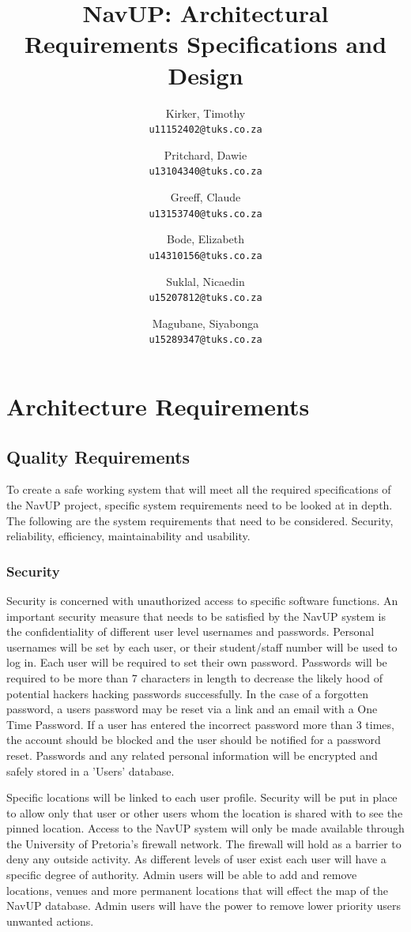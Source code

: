 \documentclass{article}
\title{NavUP: Architectural Requirements Specifications and Design}
\author{	 
	Kirker, Timothy\\
	\texttt{u11152402@tuks.co.za}
	\and
	Pritchard, Dawie\\
	\texttt{u13104340@tuks.co.za}
	\and
	Greeff, Claude\\
	\texttt{u13153740@tuks.co.za}
	\and
	Bode, Elizabeth\\
	\texttt{u14310156@tuks.co.za}
	\and
	Suklal, Nicaedin\\
	\texttt{u15207812@tuks.co.za}
	\and
	Magubane, Siyabonga\\
	\texttt{u15289347@tuks.co.za}
	\and
	
}
\begin{document}
	\maketitle
	\section{Architecture Requirements}
		\subsection{Quality Requirements}
		 To create a safe working system that will meet all the required specifications of the NavUP project, specific system requirements need to be looked at in depth. The following are the system requirements that need to be considered. Security, reliability, efficiency, maintainability and usability.
		 
		 \subsubsection{Security}
		 Security is concerned with unauthorized access to specific software functions. An important security measure that needs to be satisfied by the NavUP system is the confidentiality of different user level usernames and passwords. Personal usernames will be set by each user, or their student/staff number will be used to log in. Each user will be required to set their own password. Passwords will be required to be more than 7 characters in length to decrease the likely hood of potential hackers hacking passwords successfully. In the case of a forgotten password, a users password may be reset via a link and an email with a One Time Password. If a user has entered the incorrect password more than 3 times, the account should be blocked and the user should be notified for a password reset. Passwords and any related personal information will be encrypted and safely stored in a 'Users' database.
		 
		  Specific locations will be linked to each user profile. Security will be put in place to allow only that user or other users whom the location is shared with to see the pinned location. Access to the NavUP system will only be made available through the University of Pretoria's firewall network. The firewall will hold as a barrier to deny any outside activity. As different levels of user exist each user will have a specific degree of authority. Admin users will be able to add and remove locations, venues and more permanent locations that will effect the map of the NavUP database. Admin users will have the power to remove lower priority users unwanted actions.
		 
\end{document}
